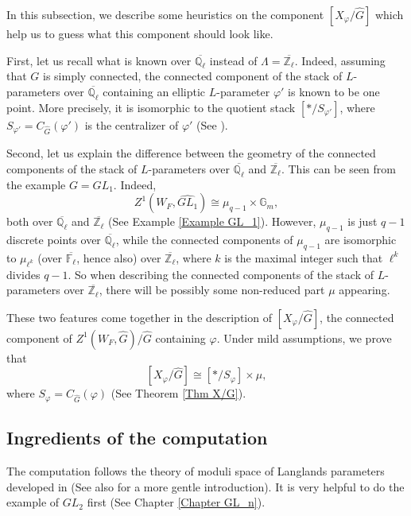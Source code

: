 In this subsection, we describe some heuristics on the component $[X_{\varphi}/\hat{G}]$ which help us to guess what this component should look like.

First, let us recall what is known over $\overline{\mathbb{Q}_{\ell}}$ instead of $\Lambda=\overline{\mathbb{Z}_{\ell}}$. Indeed, assuming that $G$ is simply connected, the connected component of the stack of $L$-parameters over $\overline{\mathbb{Q}_{\ell}}$ containing an elliptic $L$-parameter $\varphi'$ is known to be one point. More precisely, it is isomorphic to the quotient stack $[*/S_{\varphi'}]$, where $S_{\varphi'}=C_{\hat{G}}(\varphi')$ is the centralizer of $\varphi'$ (See \cite[Section X.2]{fargues2021geometrization}).

Second, let us explain the difference between the geometry of the connected components of the stack of $L$-parameters over $\overline{\mathbb{Q}_{\ell}}$ and $\overline{\mathbb{Z}_{\ell}}$. This can be seen from the example $G=GL_1$. Indeed, 
$$Z^1(W_F, \widehat{GL_1}) \cong \mu_{q-1} \times \mathbb{G}_m,$$
both over $\overline{\mathbb{Q}_{\ell}}$ and $\overline{\mathbb{Z}_{\ell}}$ (See Example \ref{Example GL_1}). However, $\mu_{q-1}$ is just $q-1$ discrete points over $\overline{\mathbb{Q}_{\ell}}$, while
the connected components of $\mu_{q-1}$ are isomorphic to $\mu_{\ell^k}$ (over $\overline{\mathbb{F}_{\ell}}$, hence also) over $\overline{\mathbb{Z}_{\ell}}$, where $k$ is the maximal integer such that $\ell^k$ divides $q-1$. So when describing the connected components of the stack of $L$-parameters over $\overline{\mathbb{Z}_{\ell}}$, there will be possibly some non-reduced part $\mu$ appearing.

These two features come together in the description of $[X_{\varphi}/\hat{G}]$, the connected component of $Z^1(W_F, \hat{G})/\hat{G}$ containing $\varphi$. Under mild assumptions, we prove that
$$[X_{\varphi}/\hat{G}] \cong [*/S_{\varphi}]\times \mu,$$
where $S_{\varphi}=C_{\hat{G}}(\varphi)$ (See Theorem \ref{Thm X/G}).

\subsection{Ingredients of the computation}

The computation follows the theory of moduli space of Langlands parameters developed in \cite[Section 2, 4]{dhkm2020moduli} (See also \cite[Section 3, 4]{dat2022ihes} for a more gentle introduction). It is very helpful to do the example of $GL_2$ first (See Chapter \ref{Chapter GL_n}).

